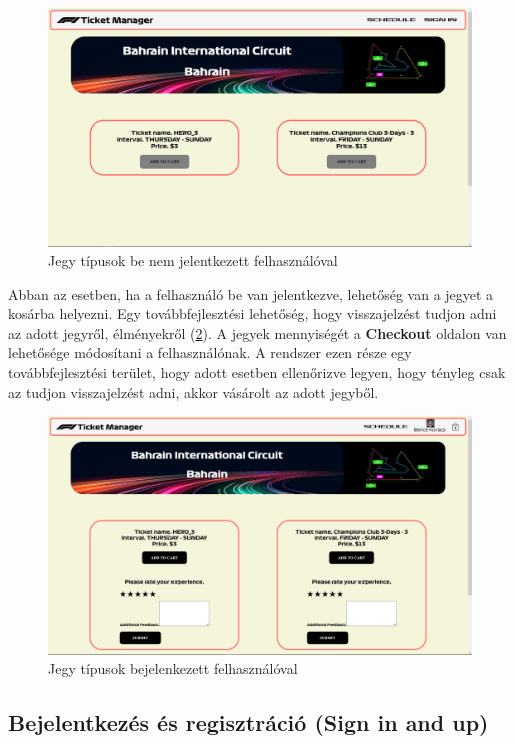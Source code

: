 \begin{figure}[!h]
	\centering
	\includegraphics[scale=0.2]{images/tickets}
	\caption{Jegy típusok be nem jelentkezett felhasználóval}
	\label{abra:ticketsUA}
\end{figure}

Abban az esetben, ha a felhasználó be van jelentkezve, lehetőség van a jegyet a kosárba helyezni. Egy továbbfejlesztési lehetőség, hogy visszajelzést tudjon adni az adott jegyről, élményekről (\ref{abra:ticketsAuth}). A jegyek mennyiségét a \textbf{Checkout} oldalon van lehetősége módosítani a felhasználónak. A rendszer ezen része egy továbbfejlesztési terület, hogy adott esetben ellenőrizve legyen, hogy tényleg csak az tudjon visszajelzést adni, akkor vásárolt az adott jegyből. 

\begin{figure}[!h]
	\centering
	\includegraphics[scale=0.2]{images/ticketsAuth}
	\caption{Jegy típusok bejelenkezett felhasználóval}
	\label{abra:ticketsAuth}
\end{figure}

\subsection {Bejelentkezés és regisztráció (Sign in and up)}

